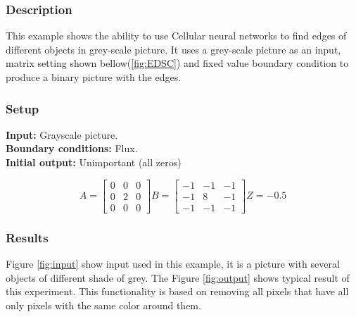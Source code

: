 \subsubsection{Description}
This example shows the ability to use Cellular neural networks to find edges of different objects in grey-scale picture. It uses a grey-scale picture as an input, matrix setting shown bellow(\ref{fig:EDSC}) and fixed value boundary condition to produce a binary picture with the edges.
\subsubsection{Setup}

\textbf{Input:} Grayscale picture.\\
\textbf{Boundary conditions:} Flux.\\
\textbf{Initial output:} Unimportant (all zeros)

\begin{minipage}{0.9\linewidth}
\begin{equation}
A =
\begin{bmatrix}
 0 & 0 & 0 \\
 0 & 2 & 0 \\
 0 & 0 & 0
\end{bmatrix}
B =
\begin{bmatrix}
 -1 & -1 & -1 \\
 -1 & 8 & -1 \\
 -1 & -1 & -1
\end{bmatrix}
Z = -0.5
\end{equation}
\label{fig:EDSC}
\end{minipage}


\subsubsection{Results}
Figure \ref{fig:input} show input used in this example, it is a picture with several objects of different shade of grey. The Figure \ref{fig:output} shows typical result of this experiment. This functionality is based on removing all pixels that have all only pixels with the same color around them. \\

